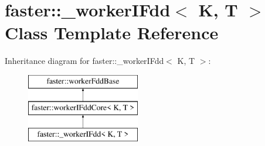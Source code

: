 \hypertarget{classfaster_1_1__workerIFdd}{}\section{faster\+:\+:\+\_\+worker\+I\+Fdd$<$ K, T $>$ Class Template Reference}
\label{classfaster_1_1__workerIFdd}
Inheritance diagram for faster\+:\+:\+\_\+worker\+I\+Fdd$<$ K, T $>$\+:\begin{figure}[H]
\begin{center}
\leavevmode
\includegraphics[height=3.000000cm]{classfaster_1_1__workerIFdd}
\end{center}
\end{figure}
